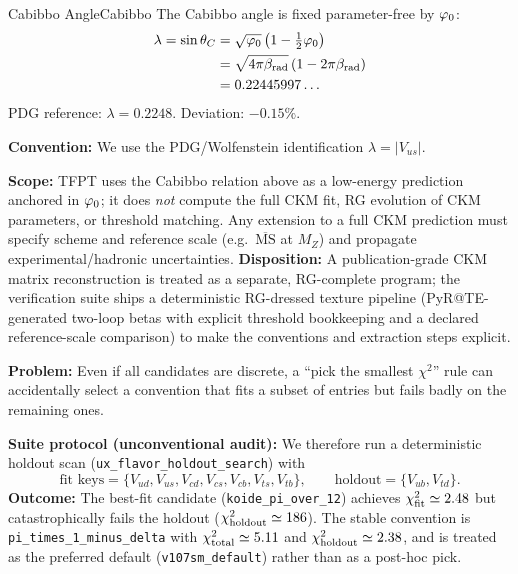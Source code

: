 \begin{corollary}{Cabibbo Angle}{Cabibbo}
The Cabibbo angle is fixed parameter-free by $\varphi_0$:
\begin{equation}
    \begin{aligned}
        \lambda = \sin\theta_C 
        &= \sqrt{\varphi_0}\left(1 - \tfrac{1}{2}\varphi_0\right) \\
        &= \sqrt{4\pi\beta_{\text{rad}}}\left(1 - 2\pi\beta_{\text{rad}}\right) \\
        &= 0.22445997\ldots
    \end{aligned}
\end{equation}
PDG reference: $\lambda = 0.2248$. Deviation: $-0.15\%$.
\end{corollary}

\begin{tcolorbox}[colback=gray!5, colframe=gray!60, 
    title={\textbf{CKM Conventions and Scale (Clarification)}}, fonttitle=\bfseries\small]
\textbf{Convention:} We use the PDG/Wolfenstein identification $\lambda = |V_{us}|$.

\textbf{Scope:} TFPT uses the Cabibbo relation above as a low-energy prediction anchored in $\varphi_0$; it does \emph{not} compute the full CKM fit, RG evolution of CKM parameters, or threshold matching.
Any extension to a full CKM prediction must specify scheme and reference scale (e.g.\ $\overline{\mathrm{MS}}$ at $M_Z$) and propagate experimental/hadronic uncertainties.
\textbf{Disposition:} A publication-grade CKM matrix reconstruction is treated as a separate, RG-complete program; the verification suite ships a deterministic RG-dressed texture pipeline (PyR@TE-generated two-loop betas with explicit threshold bookkeeping and a declared reference-scale comparison) to make the conventions and extraction steps explicit.
\end{tcolorbox}

\begin{tcolorbox}[colback=gray!5, colframe=gray!60,
    title={\textbf{Convention Lock (Holdout Protocol; avoids ``convention shopping'')}}, fonttitle=\bfseries\small]
\textbf{Problem:} Even if all candidates are discrete, a ``pick the smallest $\chi^2$'' rule can accidentally select a convention that fits a subset of entries but fails badly on the remaining ones.

\textbf{Suite protocol (unconventional audit):} We therefore run a deterministic holdout scan (\texttt{ux\_flavor\_holdout\_search}) with
\[
\text{fit keys}=\{V_{ud},V_{us},V_{cd},V_{cs},V_{cb},V_{ts},V_{tb}\},\qquad
\text{holdout}=\{V_{ub},V_{td}\}.
\]
\textbf{Outcome:} The best-fit candidate (\texttt{koide\_pi\_over\_12}) achieves $\chi^2_{\rm fit}\simeq 2.48$ but catastrophically fails the holdout ($\chi^2_{\rm holdout}\simeq 186$). The stable convention is \texttt{pi\_times\_1\_minus\_delta} with $\chi^2_{\rm total}\simeq 5.11$ and $\chi^2_{\rm holdout}\simeq 2.38$, and is treated as the preferred default (\texttt{v107sm\_default}) rather than as a post-hoc pick.
\end{tcolorbox}

